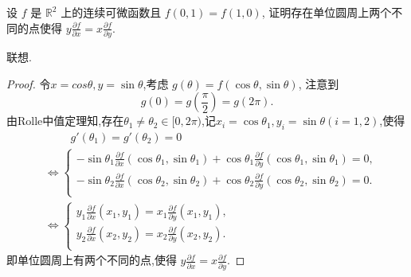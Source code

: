 \documentclass[../../main.tex]{subfiles}
\begin{document}
\begin{example}
设 \( f \) 是 \( \mathbb{R}^2 \) 上的连续可微函数且 \( f(0, 1) = f(1, 0) \), 证明存在单位圆周上两个不同的点使得 \( y \frac{\partial f}{\partial x} = x \frac{\partial f}{\partial y} \).
\end{example}
\begin{note}
联想.
\end{note}
\begin{proof}
令$x=cos\theta ,y=\sin\theta $,考虑 \( g(\theta) = f(\cos \theta, \sin \theta) \), 注意到
\[
g(0) = g\left( \frac{\pi}{2} \right) = g(2\pi).
\]
由Rolle中值定理知,存在$\theta_1\ne \theta_2 \in [0,2\pi)$,记$x_i=\cos\theta_1,y_i=\sin\theta(i=1,2)$,使得
\begin{align*}
&\quad \quad \,\,g' \left( \theta _1 \right) =g' \left( \theta _2 \right) =0
\\
&\Longleftrightarrow \begin{cases}
-\sin \theta _1\frac{\partial f}{\partial x}\left( \cos \theta _1,\sin \theta _1 \right) +\cos \theta _1\frac{\partial f}{\partial y}\left( \cos \theta _1,\sin \theta _1 \right) =0,\\
-\sin \theta _2\frac{\partial f}{\partial x}\left( \cos \theta _2,\sin \theta _2 \right) +\cos \theta _2\frac{\partial f}{\partial y}\left( \cos \theta _2,\sin \theta _2 \right) =0.\\
\end{cases}
\\
&\Longleftrightarrow \begin{cases}
y_1\frac{\partial f}{\partial x}\left( x_1,y_1 \right) =x_1\frac{\partial f}{\partial y}\left( x_1,y_1 \right) ,\\
y_2\frac{\partial f}{\partial x}\left( x_2,y_2 \right) =x_2\frac{\partial f}{\partial y}\left( x_2,y_2 \right).\\
\end{cases}
\end{align*}
即单位圆周上有两个不同的点,使得 \( y \frac{\partial f}{\partial x} = x \frac{\partial f}{\partial y} \).

\end{proof}
\end{document}
